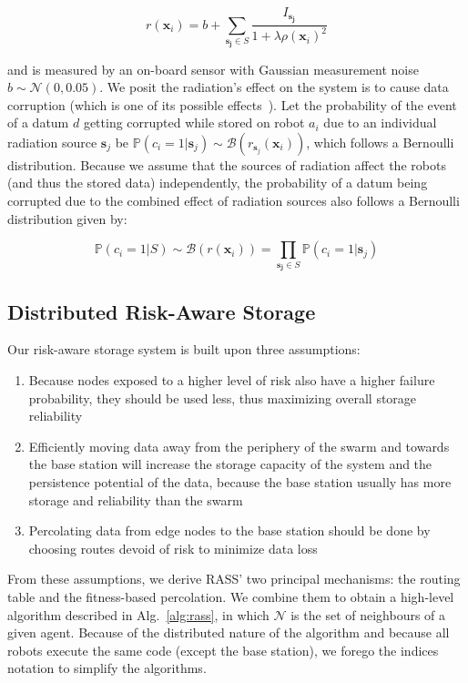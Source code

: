 \begin{equation}
    r(\bm{x}_i) = b + \sum_{\bm{s_j} \in S} \frac{I_{\bm{s_j}}}{1 + \lambda\rho(\bm{x}_i)^2}
    \label{eq:radiation}
\end{equation}

and is measured by an on-board sensor with Gaussian measurement noise
$b \sim \mathcal{N}(0, 0.05)$. We posit the radiation's effect on the system is to cause 
data corruption (which is one of its possible effects~\cite{messenger1986effects}). Let the 
probability of the event of a datum $d$ getting corrupted while stored on robot $a_i$ due 
to an individual radiation  source $\bm{s}_j$ be
$\mathbb{P}(c_i = 1 | \bm{s}_j) \sim
\mathcal{B}(r_{\bm{s}_j}(\bm{x}_i))$, which follows a Bernoulli
distribution. Because we assume that the sources of radiation affect
the robots (and thus the stored data) independently, the probability of a datum being 
corrupted due to the combined effect of radiation sources also follows a Bernoulli 
distribution given by:

\begin{equation}
    \mathbb{P}(c_i = 1 | S) \sim \mathcal{B}(r(\bm{x}_i)) = \prod_{\bm{s_j} \in S} \mathbb{P}(c_i = 1 | \bm{s}_j)
    \label{eq:failure}
\end{equation}


\subsection{Distributed Risk-Aware Storage}
Our risk-aware storage system is built upon three assumptions:

\begin{enumerate}
\item Because nodes exposed to a higher level of risk also have a higher
  failure probability, they should be used less, thus
  maximizing overall storage reliability
\item Efficiently moving data away from the periphery of the swarm and
  towards the base station will increase the storage capacity of the
  system and the persistence potential of the data, because the base
  station usually has more storage and reliability than the swarm
\item Percolating data from edge nodes to the base station should be
  done by choosing routes devoid of risk to minimize data loss
\end{enumerate}
From these assumptions, we derive \ac{RASS}' two principal mechanisms: the routing table and the fitness-based percolation. We combine them to obtain a high-level algorithm described in Alg.~\ref{alg:rass}, in which $\mathcal{N}$ is the set of neighbours of a given agent. Because of the distributed nature of the algorithm and because all robots execute the same code (except the base station), we forego the indices notation to simplify the algorithms.



